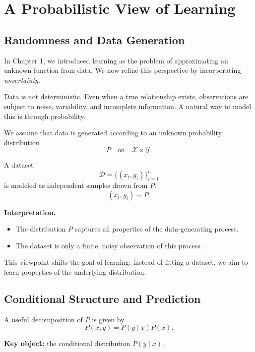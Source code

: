\chapter{A Probabilistic View of Learning}

\section{Randomness and Data Generation}

In Chapter 1, we introduced learning as the problem of approximating an unknown function from data. We now refine this perspective by incorporating \emph{uncertainty}.

\medskip

Data is not deterministic. Even when a true relationship exists, observations are subject to noise, variability, and incomplete information. A natural way to model this is through probability.

\medskip

\noindent
We assume that data is generated according to an unknown probability distribution
\[
P \quad \text{on} \quad \mathcal{X} \times \mathcal{Y}.
\]

A dataset
\[
\mathcal{D} = \{(x_i, y_i)\}_{i=1}^n
\]
is modeled as independent samples drawn from $P$:
\[
(x_i, y_i) \sim P.
\]

\medskip

\noindent
\textbf{Interpretation.}
\begin{itemize}
    \item The distribution $P$ captures all properties of the data-generating process.
    \item The dataset is only a finite, noisy observation of this process.
\end{itemize}

\medskip

This viewpoint shifts the goal of learning: instead of fitting a dataset, we aim to learn properties of the underlying distribution.

\section{Conditional Structure and Prediction}

A useful decomposition of $P$ is given by
\[
P(x,y) = P(y \mid x) P(x).
\]

\medskip

\noindent
\textbf{Key object:} the conditional distribution $P(y \mid x)$.

